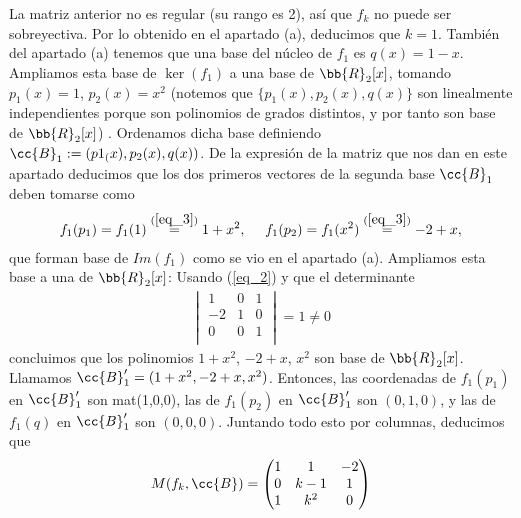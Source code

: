\documentclass[12pt]{article}
\begin{document}
\begin{ejercicio}[2.5 puntos]
\begin{enumerate}
            La matriz anterior no es regular (su rango es 2), así que $f_k$ no puede ser sobreyectiva. Por lo obtenido en el apartado (a), deducimos que $k=1$.
            También del apartado (a) tenemos que una base del núcleo de $f_1$ es $q(x) = 1-x$. Ampliamos esta base de $\ker(f_1)$ a una base de $\bb{R}_2[x]$, tomando $p_1(x) = 1$, $p_2(x)=x^2$ (notemos que $\{p_1(x), p_2(x), q(x)\}$ son linealmente independientes porque son polinomios de grados distintos, y por tanto son base de $\bb{R}_2[x]$) . Ordenamos dicha base definiendo $\cc{B}_1 := (p1_(x), p_2(x), q(x))$. De la expresión de la matriz que nos dan en este apartado deducimos que los dos primeros vectores de la segunda base $\cc{B}_1$ deben tomarse como 
            \begin{gather*}
                f_1(p_1) = f_1(1) \overset{(\ref{eq_3})}{=} 1 +x^2, \ \ \ \ f_1(p_2) = f_1(x^2) \overset{(\ref{eq_3})}{=} -2 + x,
            \end{gather*}
            que forman base de $Im(f_1)$ como se vio en el apartado (a). Ampliamos esta base a una de $\bb{R}_2[x]$: Usando (\ref{eq_2}) y que el determinante
            \begin{gather*}
                \begin{vmatrix}
                    1 & 0 & 1 \\
                    -2 & 1 & 0 \\
                    0 & 0 & 1 \\
                \end{vmatrix}
                = 1 \neq 0
            \end{gather*}
            concluimos que los polinomios $1+x^2$, $-2+x$, $x^2$ son base de $\bb{R}_2[x]$. Llamamos $\cc{B}_1'=(1+x^2, -2+x, x^2)$. Entonces, las coordenadas de $f_1(p_1)$ en $\cc{B}_1'$ son mat(1,0,0), las de $f_1(p_2)$ en $\cc{B}_1'$ son $(0,1,0)$, y las de $f_1(q)$ en $\cc{B}_1'$ son $(0,0,0)$. Juntando todo esto por columnas, deducimos que
            \begin{gather*}
                M(f_k, \cc{B}) = 
                \begin{pmatrix}
                    1 & 1 & -2 \\
                    0 & k-1 & 1 \\
                    1 & k^2 & 0 \\
                \end{pmatrix}
            \end{gather*}
        \end{enumerate}
    \end{ejercicio}
\end{document}
